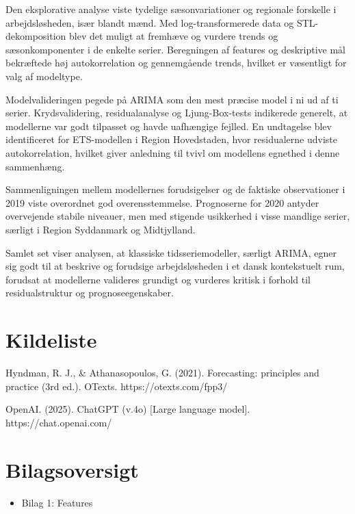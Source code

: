 \documentclass[
]{article}
\providecommand{\tightlist}{%
  \setlength{\itemsep}{0pt}\setlength{\parskip}{0pt}}\usepackage{longtable,booktabs,array}
\begin{document}
Den eksplorative analyse viste tydelige sæsonvariationer og regionale
forskelle i arbejdsløsheden, især blandt mænd. Med log-transformerede
data og STL-dekomposition blev det muligt at fremhæve og vurdere trends
og sæsonkomponenter i de enkelte serier. Beregningen af features og
deskriptive mål bekræftede høj autokorrelation og gennemgående trends,
hvilket er væsentligt for valg af modeltype.

Modelvalideringen pegede på ARIMA som den mest præcise model i ni ud af
ti serier. Krydsvalidering, residualanalyse og Ljung-Box-tests
indikerede generelt, at modellerne var godt tilpasset og havde
uafhængige fejlled. En undtagelse blev identificeret for ETS-modellen i
Region Hovedstaden, hvor residualerne udviste autokorrelation, hvilket
giver anledning til tvivl om modellens egnethed i denne sammenhæng.

Sammenligningen mellem modellernes forudsigelser og de faktiske
observationer i 2019 viste overordnet god overensstemmelse. Prognoserne
for 2020 antyder overvejende stabile niveauer, men med stigende
usikkerhed i visse mandlige serier, særligt i Region Syddanmark og
Midtjylland.

Samlet set viser analysen, at klassiske tidsseriemodeller, særligt
ARIMA, egner sig godt til at beskrive og forudsige arbejdsløsheden i et
dansk kontekstuelt rum, forudsat at modellerne valideres grundigt og
vurderes kritisk i forhold til residualstruktur og prognoseegenskaber.

\newpage

\section{Kildeliste}\label{kildeliste}

Hyndman, R. J., \& Athanasopoulos, G. (2021). Forecasting: principles
and practice (3rd ed.). OTexts. https://otexts.com/fpp3/

OpenAI. (2025). ChatGPT (v.4o) {[}Large language model{]}.
https://chat.openai.com/

\newpage

\section{Bilagsoversigt}\label{bilagsoversigt}

\begin{itemize}
\tightlist
\item
  Bilag 1: Features
\end{itemize}
\end{document}
